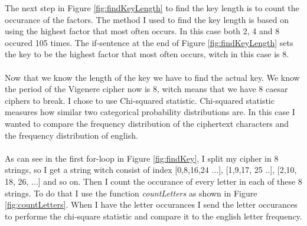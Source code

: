 \documentclass[12pt, letterpaper]{article}
\begin{document}
The next step in Figure \ref{fig:findKeyLength} to find the key length is to count the occurance of the factors. The method I used to find the key length is based on using the highest factor that most often occurs. In this case both 2, 4 and 8 occured 105 times. The if-sentence at the end of Figure \ref{fig:findKeyLength} sets the key to be the highest factor that most often occurs, witch in this case is 8.
\\ \\
Now that we know the length of the key we have to find the actual key. We know the period of the Vigenere cipher now is 8, witch means that we have 8 caesar ciphers to break. I chose to use Chi-squared statistic. Chi-squared statistic measures how similar two categorical probability distributions are. In this case I wanted to compare the frequency distribution of the ciphertext characters and the frequency distribution of english.
\\ \\
As can see in the first for-loop in Figure \ref{fig:findKey}, I split my cipher in 8 strings, so I get a string witch consist of index [0,8,16,24 ...], [1,9,17, 25 ..], [2,10, 18, 26, ...] and so on. Then I count the occurance of every letter in each of these 8 strings. To do that I use the function \textit{countLetters} as shown in Figure \ref{fig:countLetters}. When I have the letter occurances I send the letter occurances to performe the chi-square statistic and compare it to the english letter frequency. 
\end{document}
